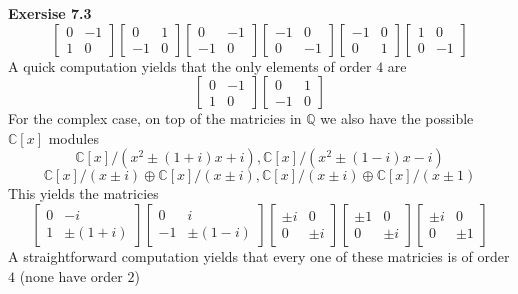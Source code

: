 \documentclass[12pt]{article}
\newenvironment{ques}[1]{\textbf{Exersise #1}\vspace{1 mm}\\ }{\bigskip}
\theoremstyle{definition}
\newcommand{\Q}{\mathbb Q}
\newcommand{\C}{\mathbb C}
\begin{document}
\begin{ques}{7.3}
$$	\begin{bmatrix} 
	0 & -1 \\ 
	1 & 0
	\end{bmatrix}
	\begin{bmatrix} 
	0 & 1 \\ 
	-1 & 0
	\end{bmatrix}
	\begin{bmatrix} 
	0 & -1 \\ 
	-1 & 0
	\end{bmatrix}
	\begin{bmatrix} 
	-1 & 0 \\ 
	0 & -1
	\end{bmatrix}
	\begin{bmatrix} 
	-1 & 0 \\ 
	0 & 1
	\end{bmatrix}
	\begin{bmatrix} 
	1 & 0 \\ 
	0 & -1
	\end{bmatrix}
	$$
	A quick computation yields that the only elements of order $4$ are 
	$$
	\begin{bmatrix} 
	0 & -1 \\ 
	1 & 0
	\end{bmatrix}
	\begin{bmatrix} 
	0 & 1 \\ 
	-1 & 0
	\end{bmatrix}
	$$
	For the complex case, on top of the matricies in $\Q$ we also have the
	possible $\C[x]$ modules 
	$$\C[x]/(x^2 \pm (1 + i)x + i), \C[x]/(x^2 \pm (1 - i)x - i)$$
	$$\C[x]/(x \pm i)\oplus \C[x]/(x \pm i), \C[x]/(x \pm i)\oplus \C[x]/(x \pm 1)$$
	This yields the matricies
	$$\begin{bmatrix} 
	0 & -i \\ 
	1 & \pm(1 + i)
	\end{bmatrix}
	\begin{bmatrix} 
	0 & i \\ 
	-1 & \pm(1 - i)
	\end{bmatrix}
	\begin{bmatrix} 
	\pm i & 0 \\ 
	0 & \pm i
	\end{bmatrix}
	\begin{bmatrix} 
	\pm 1 & 0 \\ 
	0 & \pm i
	\end{bmatrix}
	\begin{bmatrix} 
	\pm i & 0 \\ 
	0 & \pm 1
	\end{bmatrix}
	$$
	A straightforward computation yields that every one of these matricies is
	of order $4$ (none have order $2$)
\end{ques}
\end{document}
